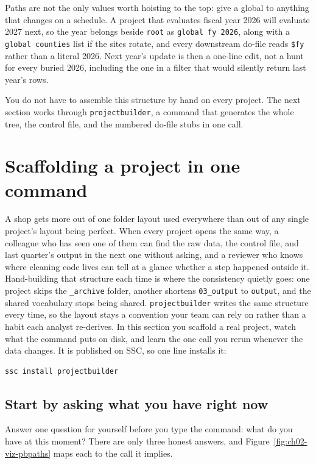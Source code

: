 \documentclass[
    a4paper,
    fontsize=10pt,
    twoside=true,
    numbers=noenddot,
]{kaobook}
\begin{document}
Paths are not the only values worth hoisting to the top: give a global to anything that changes on a schedule. A project that evaluates fiscal year 2026 will evaluate 2027 next, so the year belongs beside \texttt{root} as \texttt{global fy 2026}, along with a \texttt{global counties} list if the sites rotate, and every downstream do-file reads \texttt{\$fy} rather than a literal 2026. Next year's update is then a one-line edit, not a hunt for every buried 2026, including the one in a filter that would silently return last year's rows.

You do not have to assemble this structure by hand on every project. The next section works through \texttt{projectbuilder}, a command that generates the whole tree, the control file, and the numbered do-file stubs in one call.

\section{Scaffolding a project in one command}\label{sec:ch02-projectbuilder}
A shop gets more out of one folder layout used everywhere than out of any single project's layout being perfect. When every project opens the same way, a colleague who has seen one of them can find the raw data, the control file, and last quarter's output in the next one without asking, and a reviewer who knows where cleaning code lives can tell at a glance whether a step happened outside it. Hand-building that structure each time is where the consistency quietly goes: one project skips the \texttt{\_archive} folder, another shortens \texttt{03\_output} to \texttt{output}, and the shared vocabulary stops being shared. \texttt{projectbuilder} writes the same structure every time, so the layout stays a convention your team can rely on rather than a habit each analyst re-derives. In this section you scaffold a real project, watch what the command puts on disk, and learn the one call you rerun whenever the data changes. It is published on SSC, so one line installs it:
\par
{\footnotesize
\begin{verbatim}
ssc install projectbuilder
\end{verbatim}
}

\subsection{Start by asking what you have right now}\label{sec:ch02-pb-paths}
Answer one question for yourself before you type the command: what do you have at this moment? There are only three honest answers, and Figure~\ref{fig:ch02-viz-pbpaths} maps each to the call it implies.
\end{document}
